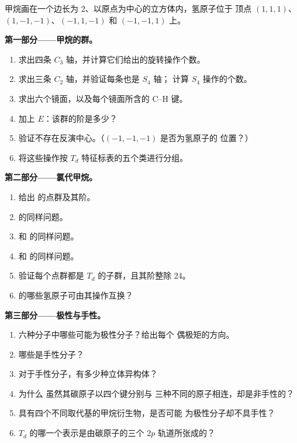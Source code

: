 \begin{problem}
\label{pb:b3:point-groups:1}
甲烷画在一个边长为 2、以原点为中心的立方体内，氢原子位于
顶点 $(1,1,1)$、$(1,-1,-1)$、$(-1,1,-1)$ 和 $(-1,-1,1)$ 上。

\medskip\noindent\textbf{第一部分——甲烷的群。}
\begin{enumerate}
  \item 求出四条 $C_3$ 轴，并计算它们给出的旋转操作个数。
  \item 求出三条 $C_2$ 轴，并验证每条也是 $S_4$ 轴；
        计算 $S_4$ 操作的个数。
  \item 求出六个镜面，以及每个镜面所含的 C--H 键。
  \item 加上 $E$：该群的阶是多少？
  \item 验证不存在反演中心。（$(-1,-1,-1)$ 是否为氢原子的
        位置？）
  \item 将这些操作按 $T_d$ 特征标表的五个类进行分组。
\end{enumerate}

\medskip\noindent\textbf{第二部分——氯代甲烷。}
\begin{enumerate}[resume]
  \item 给出  的点群及其阶。
  \item {} 的同样问题。
  \item {} 和  的同样问题。
  \item {} 和  的同样问题。
  \item 验证每个点群都是 $T_d$ 的子群，且其阶整除 24。
  \item {} 的哪些氢原子可由其操作互换？
\end{enumerate}

\medskip\noindent\textbf{第三部分——极性与手性。}
\begin{enumerate}[resume]
  \item 六种分子中哪些可能为极性分子？给出每个
        偶极矩的方向。
  \item 哪些是手性分子？
  \item 对于手性分子，有多少种立体异构体？
  \item 为什么  虽然其碳原子以四个键分别与
        三种不同的原子相连，却是非手性的？
  \item 具有四个不同取代基的甲烷衍生物，是否可能
        为极性分子却不具手性？
  \item $T_d$ 的哪一个表示是由碳原子的三个
        $2p$ 轨道所张成的？
\end{enumerate}


\end{problem}
